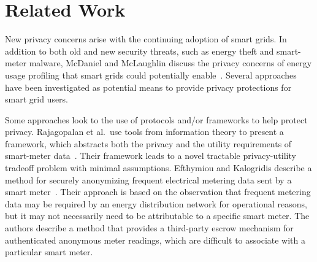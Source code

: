 \section{Related Work}
\label{sec:related}


New privacy concerns arise with the continuing adoption of smart grids. In addition to both old and new security threats, such as energy theft and smart-meter malware, McDaniel and McLaughlin discuss the privacy concerns of energy usage profiling that smart grids could potentially enable~\cite{mcdaniel2009security}. Several approaches have been investigated as potential means to provide privacy protections for smart grid users.

Some approaches look to the use of protocols and/or frameworks to help protect privacy. Rajagopalan et al.\ use tools from information theory to present a framework, which abstracts both the privacy and the utility requirements of smart-meter data~\cite{rajagopalan2011smart,sankar2013smart}. Their framework leads to a novel tractable privacy-utility tradeoff problem with minimal assumptions. Efthymiou and Kalogridis describe a method for securely anonymizing frequent electrical metering data sent by a smart meter~\cite{efthymiou2010smart}. Their approach is based on the observation that frequent metering data may be required by an energy distribution network for operational reasons, but it may not necessarily need to be attributable to a specific smart meter. The authors describe a method that provides a third-party escrow mechanism for authenticated anonymous meter readings, which are difficult to associate with a particular smart meter.

